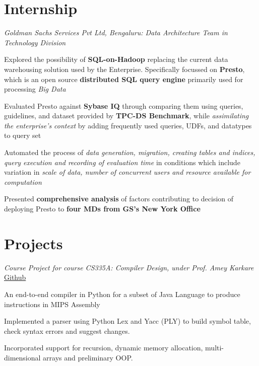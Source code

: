 \documentclass[a4paper]{norm-resume}
\begin{document}

\section{Internship \hrulefill}

\vspace{2mm} %
      
    \emph{Goldman Sachs Services Pvt Ltd, Bengaluru: Data Architecture Team in Technology Division}
    \vspace{3mm}
    \begin{tightitemize}
    \small
    {
    \item Explored the possibility of \textbf{SQL-on-Hadoop} replacing the current data warehousing solution used by the Enterprise. Specifically focussed on \textbf{Presto}, which is an open source \textbf{distributed SQL query engine} primarily used for processing \textit{Big Data}
    \item Evaluated Presto against \textbf{Sybase IQ} through comparing them using queries, guidelines, and dataset provided by \textbf{TPC-DS Benchmark}, while \textit{assimilating the enterprise's context} by adding frequently used queries, UDFs, and datatypes to query set
    \item Automated the process of \textit{data generation, migration, creating tables and indices, query execution and recording of evaluation time} in conditions which include variation in \textit{scale of data, number of concurrent users and resource available for computation}
    \item Presented \textbf{comprehensive analysis} of factors contributing to decision of deploying Presto to \textbf{four MDs from GS's New York Office}
    }
    \end{tightitemize}


\section{Projects \hrulefill}

\vspace{2mm} %
      
    \emph{Course Project for course CS335A: Compiler Design, under Prof. Amey Karkare} \hfill \small \href{https://github.com/vtantia/java-compiler}{Github}
    \vspace{3mm}
    \begin{tightitemize}
    \small
    {
    \item An end-to-end compiler in Python for a subset of Java Language to produce instructions in MIPS Assembly
    \item Implemented a parser using Python Lex and Yacc (PLY) to build symbol table, check syntax errors and suggest changes.
    \item Incorporated support for recursion, dynamic memory allocation, multi-dimensional arrays and preliminary OOP.
    }
    \end{tightitemize}
\end{document}
